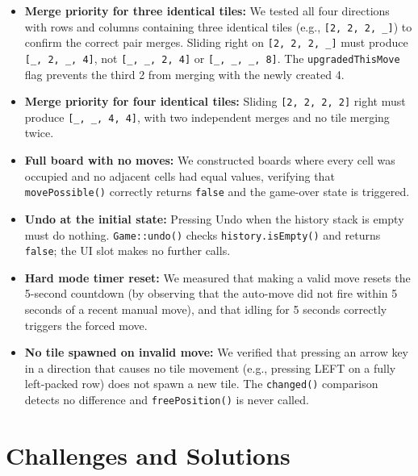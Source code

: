 \documentclass[a4paper,12pt]{article}
\begin{document}
\begin{itemize}
    \item \textbf{Merge priority for three identical tiles:} We tested all four directions with rows and columns containing three identical tiles (e.g., \texttt{[2, 2, 2, \_]}) to confirm the correct pair merges. Sliding right on \texttt{[2, 2, 2, \_]} must produce \texttt{[\_, 2, \_, 4]}, not \texttt{[\_, \_, 2, 4]} or \texttt{[\_, \_, \_, 8]}. The \texttt{upgradedThisMove} flag prevents the third 2 from merging with the newly created 4.

    \item \textbf{Merge priority for four identical tiles:} Sliding \texttt{[2, 2, 2, 2]} right must produce \texttt{[\_, \_, 4, 4]}, with two independent merges and no tile merging twice.

    \item \textbf{Full board with no moves:} We constructed boards where every cell was occupied and no adjacent cells had equal values, verifying that \texttt{movePossible()} correctly returns \texttt{false} and the game-over state is triggered. 

    \item \textbf{Undo at the initial state:} Pressing Undo when the history stack is empty must do nothing. \texttt{Game::undo()} checks \texttt{history.isEmpty()} and returns \texttt{false}; the UI slot makes no further calls.

    \item \textbf{Hard mode timer reset:} We measured that making a valid move resets the 5-second countdown (by observing that the auto-move did not fire within 5 seconds of a recent manual move), and that idling for 5 seconds correctly triggers the forced move.

    \item \textbf{No tile spawned on invalid move:} We verified that pressing an arrow key in a direction that causes no tile movement (e.g., pressing LEFT on a fully left-packed row) does not spawn a new tile. The \texttt{changed()} comparison detects no difference and \texttt{freePosition()} is never called.
\end{itemize}

\section{Challenges and Solutions}
\end{document}
